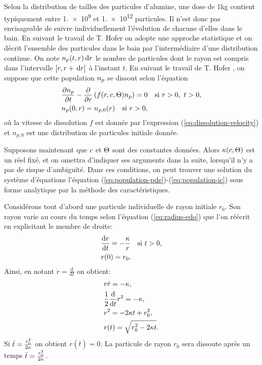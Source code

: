 Selon la distribution de tailles des particules d'alumine, une dose de
\num{1}\si{\kilo\gram} contient typiquement entre \num{1.e+9} et
\num{1.e+12} particules. Il n'est donc pas envisageable de suivre
individuellement l'évolution de chacune d'elles dans le bain. En
suivant le travail de T. Hofer \cite{Hofer2011} on adopte une approche
statistique et on décrit l'ensemble des particules dans le bain par
l'intermédiaire d'une distribution continue. On note $n_p(t, r)\,\mathrm dr$ le
nombre de particules dont le rayon est compris dans l'intervalle $[r,
  r + \,\mathrm dr]$ à l'instant $t$. En suivant le travail de T. Hofer \cite{Hofer2011}, on suppose que
cette population $n_p$ se dissout selon l'équation
\begin{align}
&\frac{\partial n_p}{\partial t} - \frac{\partial
}{\partial r}\left( f(r,c,\Theta)n_p \right) = 0\quad \text{si } r > 0,\ t > 0,\label{eq:population-pde}\\
&n_p(0, r) = n_{p,0}(r) \quad \text{si } r > 0,\label{eq:population-ic}
\end{align}
où la vitesse de dissolution $f$ est donnée par l'expression
(\ref{eq:dissolution-velocity}) et $n_{p,0}$ est une distribution de
particules initiale donnée.

Supposons maintenant que $c$ et $\Theta$ sont des
constantes données. Alors
$\kappa(c,\Theta)$ est un réel fixé, et
on omettra d'indiquer ses arguments dans la suite, lorsqu'il n'y a pas
de risque d'ambiguïté. Dans ces conditions, on peut trouver une
solution du système d'équations l'équation
(\ref{eq:population-pde})-(\ref{eq:population-ic}) sous forme
analytique par la méthode des caractéristiques.

Considérons tout d'abord une particule individuelle de rayon initiale
$r_0$. Son rayon varie au cours du temps selon l'équation
(\ref{eq:radius-edo}) que l'on réécrit en explicitant le membre de
droite:
\begin{align*}
  &\frac{\mathrm d r}{\mathrm d t} = -\frac{\kappa}{r} \quad \text{si } t
  > 0,\\
  & r(0) = r_0.
\end{align*}
Ainsi, en notant $\dot r = \frac{\mathrm d}{\mathrm dt}$ on obtient:
\begin{align}
  &r\dot r = -\kappa,\nonumber\\
  &\frac{1}{2}\frac{\mathrm d}{\mathrm dt}r^2 = -\kappa,\nonumber\\
  &r^2 = -2\kappa t + r_0^2,\nonumber\\
  &r(t) = \sqrt{r_0^2-2\kappa t}.\label{eq:particle-exact}
\end{align}
Si $\bar t = \frac{r_0^2}{2\kappa}$ on obtient $r(\bar
t) = 0$. La particule de rayon $r_0$ sera dissoute après un temps $\bar
t = \frac{r_0^2}{2\kappa}$.

